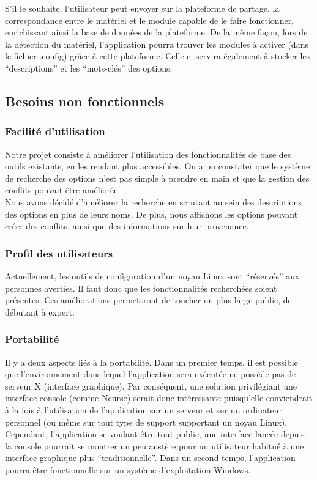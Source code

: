 \documentclass[16pts]{report}
\begin{document}
S’il le souhaite, l’utilisateur peut envoyer sur la plateforme de partage, la
correspondance entre le matériel et le module capable de le faire fonctionner,
enrichissant ainsi la base de données de la plateforme.  De la même façon, lors
de la détection du matériel, l’application pourra trouver les modules à activer
(dans le fichier .config) grâce à cette plateforme. Celle-ci servira également
à stocker les “descriptions” et les “mots-clés” des options.

        \subsection{Besoins non fonctionnels}
        \label{sub:Besoins non fonctionnels}
\subsubsection{Facilité d'utilisation}
\label{sec:Facilité d'utilisation}

Notre projet consiste à améliorer l’utilisation des fonctionnalités de base des
outils existants, en les rendant plus accessibles. On a pu constater que le
système de recherche des options n’est pas simple à prendre en main et que la
gestion des conflits pouvait être améliorée.
\\

Nous avons décidé d’améliorer la recherche en scrutant au sein des descriptions
des options en plus de leurs noms. De plus, nous affichons les options pouvant
créer des conflits, ainsi que des informations sur leur provenance.

\subsubsection{Profil des utilisateurs}
\label{sec:Profil des utilisateurs}

Actuellement, les outils de configuration d’un noyau Linux sont “réservés” aux
personnes averties. Il faut donc que les fonctionnalités recherchées soient
présentes. Ces améliorations permettront de toucher un plus large public, de
débutant à expert.

\subsubsection{Portabilité}
\label{sec:Portabilité}

Il y a deux aspects liés à la portabilité. Dans un premier temps, il est
possible que l’environnement dans lequel l’application sera exécutée ne possède
pas de serveur X (interface graphique). Par conséquent, une solution
privilégiant une interface console (comme Ncurse) serait donc intéressante
puisqu’elle conviendrait à la fois à l’utilisation de l’application sur un
serveur et sur un ordinateur personnel (ou même sur tout type de support
supportant un noyau Linux). Cependant, l’application se voulant être tout
public, une interface lancée depuis la console pourrait se montrer un peu
austère pour un utilisateur habitué à une interface graphique plus
“traditionnelle”.  Dans un second temps, l’application pourra être
fonctionnelle sur un système d’exploitation Windows.
\end{document}
